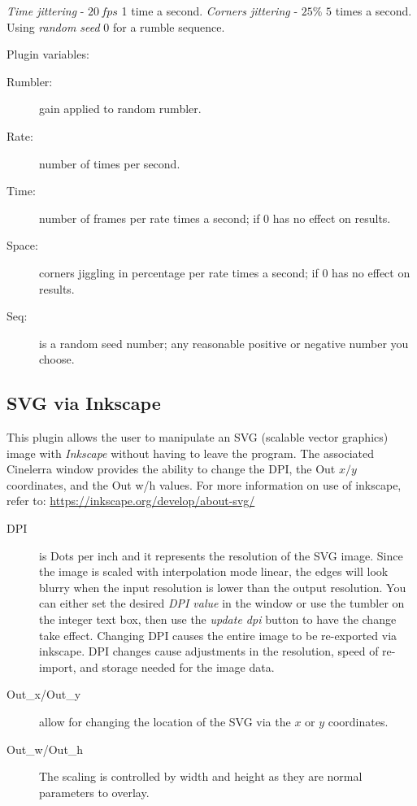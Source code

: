 \textit{Time jittering} - $20\, fps$ 1 time a second.
\textit{Corners jittering} - $25\%$  $5$ times a second.
Using \textit{random seed} $0$ for a rumble sequence.

Plugin variables:

\begin{description}
    \item[Rumbler:] gain applied to random rumbler.
    \item[Rate:] number of times per second.
    \item[Time:] number of frames per rate times a second; if 0 has no effect on results.
    \item[Space:] corners jiggling in percentage per rate times a second; if 0 has no effect on results.
    \item[Seq:] is a random seed number; any reasonable positive or negative number you choose.
\end{description}

\subsection{SVG via Inkscape}%
\label{sub:svg_via_inkscape}

This plugin allows the user to manipulate an SVG (scalable vector graphics) image with \textit{Inkscape} without having to leave the program. The associated Cinelerra window provides the ability to change the DPI, the Out $x/y$ coordinates, and the Out w/h values. For more information on use of inkscape, refer to: {\small \url{https://inkscape.org/develop/about-svg/}}

\begin{description}
    \item[DPI] is Dots per inch and it represents the resolution of the SVG image. Since the image is scaled with interpolation mode linear, the edges will look blurry when the input resolution is lower than the output resolution. You can either set the desired \textit{DPI value} in the window or use the tumbler on the integer text box, then use the \textit{update dpi} button to have the change take effect. Changing DPI causes the entire image to be re-exported via inkscape. DPI changes cause adjustments in the resolution, speed of re-import, and storage needed for the image data.
    \item[Out\_x/Out\_y] allow for changing the location of the SVG via the $x$ or $y$ coordinates.
    \item[Out\_w/Out\_h]  The scaling is controlled by width and height as they are normal parameters to overlay.
\end{description}

